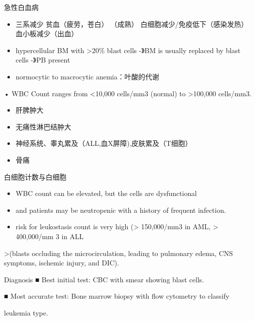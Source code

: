 \documentclass[
  ignorenonframetext,
]{beamer}
\begin{document}
\begin{frame}
\begin{block}{急性白血病}
\protect\hypertarget{ux6025ux6027ux767dux8840ux75c5}{}
\begin{itemize}
\item
  三系减少 贫血（疲劳，苍白） （成熟）
  白细胞减少/免疫低下（感染发热）血小板减少（出血）
\item
  hypercellular BM with \textgreater20\% blast cells -》BM is usually
  replaced by blast cells -》PB present
\item
  normocytic to macrocytic anemia：叶酸的代谢
\end{itemize}

• WBC Count ranges from \textless10,000 cells/mm3 (normal) to
\textgreater100,000 cells/mm3.
\end{block}
\end{frame}

\begin{frame}
\begin{itemize}
\item
  肝脾肿大
\item
  无痛性淋巴结肿大
\item
  神经系统、睾丸累及（ALL,血X屏障),皮肤累及（T细胞）
\item
  骨痛
\end{itemize}
\end{frame}

\begin{frame}
\begin{block}{白细胞计数与白细胞}
\protect\hypertarget{ux767dux7ec6ux80deux8ba1ux6570ux4e0eux767dux7ec6ux80de}{}
\begin{itemize}
\item
  WBC count can be elevated, but the cells are dysfunctional
\item
  and patients may be neutropenic with a history of frequent infection.
\item
  risk for leukostasis count is very high (\textgreater{} 150,000/mm3 in
  AML, \textgreater{} 400,000/mm 3 in ALL
\end{itemize}

\textgreater(blasts occluding the microcirculation, leading to pulmonary
edema, CNS symptoms, ischemic injury, and DIC).
\end{block}
\end{frame}

\begin{frame}
\begin{block}{Diagnosis}
\protect\hypertarget{diagnosis}{}
■ Best initial test: CBC with smear showing blast cells.

■ Most accurate test: Bone marrow biopsy with flow cytometry to classify

leukemia type.
\end{block}
\end{frame}
\end{document}
